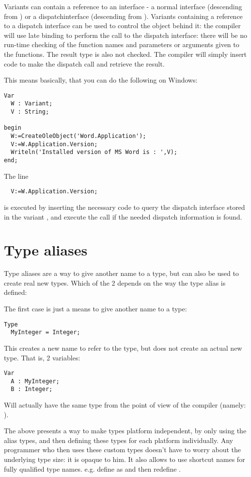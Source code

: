 Variants can contain a reference to an interface - a normal interface
(descending from ) or a dispatchinterface (descending 
from ). Variants containing a reference to a dispatch
interface can be used to control the object behind it: the compiler will use
late binding to perform the call to the dispatch interface: there will be no
run-time checking of the function names and parameters or arguments given to 
the functions. The result type is also not checked. The compiler will simply
insert code to make the dispatch call and retrieve the result. 

This means basically, that you can do the following on Windows:
\begin{verbatim}
Var
  W : Variant;
  V : String;

begin
  W:=CreateOleObject('Word.Application');
  V:=W.Application.Version;
  Writeln('Installed version of MS Word is : ',V);
end;
\end{verbatim}
The line 
\begin{verbatim}
  V:=W.Application.Version;
\end{verbatim}
is executed by inserting the necessary code to query the dispatch interface
stored in the variant , and execute the call if the needed dispatch
information is found.

\section{Type aliases}
Type aliases are a way to give another name to a type, but can also be used
to create real new types. Which of the 2 depends on the way the type alias
is defined:

The first case is just a means to give another name to a type:
\begin{verbatim}
Type
  MyInteger = Integer;
\end{verbatim}
This creates a new name to refer to the  type, but does not create an
actual new type. That is, 2 variables:
\begin{verbatim}
Var
  A : MyInteger;
  B : Integer;
\end{verbatim}
Will actually have the same type from the point of view of the compiler
(namely: ).

The above presents a way to make types platform independent, by only using the
alias types, and then defining these types for each platform individually. 
Any programmer who then uses these custom types doesn't have to worry
about the underlying type size: it is opaque to him. It also allows to use shortcut names 
for fully qualified type names. e.g. define  as
 and then redefine .

